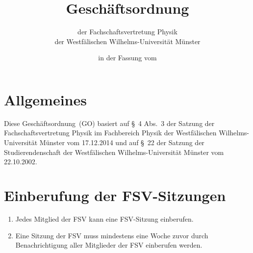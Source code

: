 \documentclass[
	a4paper,
	12pt,
	oneside,
	parskip=half-,
	pagesize,
	headsepline,
	german,
	ngerman
]{scrartcl}
\title{Geschäftsordnung}
\subtitle{der Fachschaftsvertretung Physik\\
der Westfälischen Wilhelms-Universität Münster}
\date{in der Fassung vom \formatdate{15}{4}{2015}}
\author{}
\begin{document}
\maketitle

\section{Allgemeines}
Diese Geschäftsordnung~(GO) basiert auf §~4 Abs.~3 der Satzung der Fachschaftsvertretung Physik im Fachbereich Physik der Westfälischen Wilhelms-Universität Münster vom 17.12.2014 und auf §~22 der Satzung der Studierendenschaft der Westfälischen Wilhelms-Universität Münster vom 22.10.2002.

\section{Einberufung der FSV-Sitzungen}
\begin{enumerate}
	\item Jedes Mitglied der FSV kann eine FSV-Sitzung einberufen.
	\item Eine Sitzung der FSV muss mindestens eine Woche zuvor durch Benachrichtigung aller Mitglieder der FSV einberufen werden.
\end{enumerate}
\end{document}
